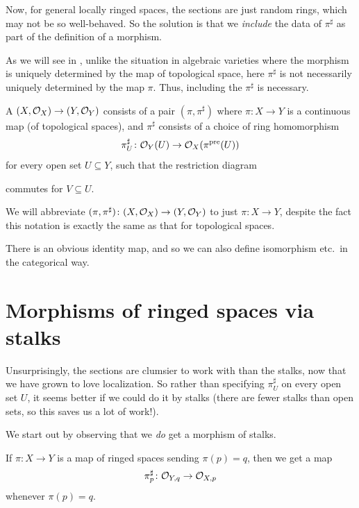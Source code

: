 Now, for general locally ringed spaces,
the sections are just random rings,
which may not be so well-behaved.
So the solution is that we \emph{include} the data of $\pi^\sharp$
as part of the definition of a morphism.
\begin{remark}
	As we will see in , unlike the situation in algebraic varieties
	where the morphism is uniquely determined by the map of topological space,
	here $\pi^\sharp$ is not necessarily uniquely determined by the map $\pi$.
	Thus, including the $\pi^\sharp$ is necessary.
\end{remark}
\begin{definition}
	A 
	$(X, \mathcal O_X) \to (Y, \mathcal O_Y)$ consists of a pair $(\pi, \pi^\sharp)$
	where $\pi \colon X \to Y$ is a continuous map
	(of topological spaces),
	and $\pi^\sharp$ consists of a choice of ring homomorphism
	\[ \pi^\sharp_U \colon \mathcal O_Y(U) \to \mathcal O_X(\pi^{\text{pre}}(U)) \]
	for every open set $U \subseteq Y$, such that the restriction diagram
	\begin{center}
	\end{center}
	commutes for $V \subseteq U$.
\end{definition}
\begin{abuse}
	We will abbreviate $(\pi, \pi^\sharp) \colon (X, \mathcal O_X) \to (Y, \mathcal O_Y)$
	to just $\pi \colon X \to Y$,
	despite the fact this notation is exactly
	the same as that for topological spaces.
\end{abuse}

There is an obvious identity map,
and so we can also define isomorphism etc.\ in the categorical way.

\section{Morphisms of ringed spaces via stalks}
Unsurprisingly, the sections are clumsier to work with
than the stalks, now that we have grown to love localization.
So rather than specifying $\pi^\sharp_U$ on every open set $U$,
it seems better if we could do it by stalks
(there are fewer stalks than open sets,
so this saves us a lot of work!).

We start out by observing that we \emph{do}
get a morphism of stalks.
\begin{proposition}
	If $\pi \colon X \to Y$ is a map of ringed spaces
	sending $\pi(p) = q$, then we get a map
	\[ \pi_p^\sharp \colon \mathcal O_{Y,q} \to \mathcal O_{X,p} \]
	whenever $\pi(p) = q$.
\end{proposition}

